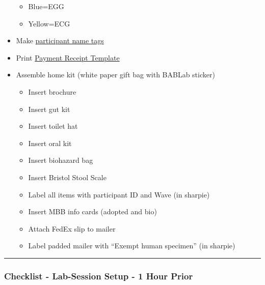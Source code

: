 \documentclass[]{book}
\providecommand{\tightlist}{%
  \setlength{\itemsep}{0pt}\setlength{\parskip}{0pt}}
\begin{document}
\begin{itemize}
  \begin{itemize}
  \tightlist
  \item
    Blue=EGG
  \item
    Yellow=ECG
  \end{itemize}
\item
  Make \href{https://app.box.com/file/630320259767}{participant name tags}
\item
  Print \href{https://app.box.com/file/630326568873}{Payment Receipt Template}
\item
  Assemble home kit (white paper gift bag with BABLab sticker)

  \begin{itemize}
  \tightlist
  \item
    Insert brochure
  \item
    Insert gut kit
  \item
    Insert toilet hat
  \item
    Insert oral kit
  \item
    Insert biohazard bag
  \item
    Insert Bristol Stool Scale
  \item
    Label all items with participant ID and Wave (in sharpie)
  \item
    Insert MBB info cards (adopted and bio)
  \item
    Attach FedEx slip to mailer
  \item
    Label padded mailer with ``Exempt human specimen'' (in sharpie)
  \end{itemize}
\end{itemize}

\begin{center}\rule{0.5\linewidth}{0.5pt}\end{center}

\hypertarget{checklist---lab-session-setup---1-hour-prior}{%
\subsubsection{Checklist - Lab-Session Setup - 1 Hour Prior}\label{checklist---lab-session-setup---1-hour-prior}}
\end{document}
